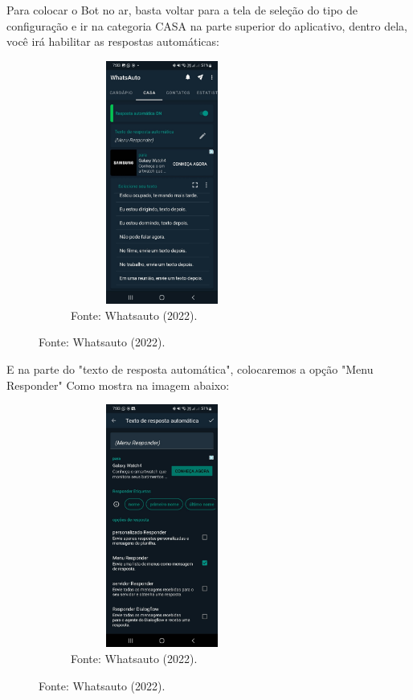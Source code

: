 \begin{itemize}
        Para colocar o Bot no ar, basta voltar para a tela de seleção do tipo de configuração e ir na categoria CASA na parte superior do aplicativo, dentro dela, você irá habilitar as respostas automáticas:

\begin{figure}[!htb]
\centering
\captionsetup[subfigure]{labelformat=empty}
\caption{``Menu Ligar 1''}
\begin{subfigure}{.5\textwidth}
\centering
\includegraphics[width=6cm,height=8cm]{Bot/Partes/Imagens/Menu ligar 1.jpeg}
\caption{Fonte: Whatsauto (2022).}
\end{subfigure}%
\end{figure}

         E na parte do "texto de resposta automática", colocaremos a opção "Menu Responder" Como mostra na imagem abaixo:

\begin{figure}[!htb]
\centering
\captionsetup[subfigure]{labelformat=empty}
\caption{``Menu Ligar 2''}
\begin{subfigure}{.5\textwidth}
\centering
\includegraphics[width=6cm,height=8cm]{Bot/Partes/Imagens/Menu Ligar 2.jpeg}
\caption{Fonte: Whatsauto (2022).}
\end{subfigure}%
\end{figure}


\end{itemize}
